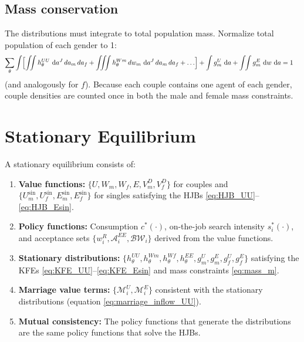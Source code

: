 \documentclass[11pt]{article}
\newcommand{\wR}{w^{R}}
\newcommand{\dw}{\,\mathrm{d}w}
\newcommand{\da}{\,\mathrm{d}a}
\begin{document}
\subsection{Mass conservation}

The distributions must integrate to total population mass. Normalize total population of each gender to 1:
\begin{align}
    \sum_\theta \int \Bigl[
        \int\!\!\!\int h_\theta^{UU}\, \da^J\, da_m\, da_f
        + \int\!\!\!\int\!\!\!\int h_\theta^{Wm}\, dw_m\, \da^J\, da_m\, da_f + \ldots
    \Bigr]
    + \int g_m^U\, \da + \int\!\!\int g_m^E\, \dw\, \da &= 1 \label{eq:mass_m}
\end{align}
(and analogously for $f$). Because each couple contains one agent of each gender, couple densities are counted once in both the male and female mass constraints.


\section{Stationary Equilibrium}

\begin{definition}
A stationary equilibrium consists of:
\begin{enumerate}
    \item \textbf{Value functions:} $\{U, W_m, W_f, E, V_m^D, V_f^D\}$ for couples and $\{U_m^{\sin}, U_f^{\sin}, E_m^{\sin}, E_f^{\sin}\}$ for singles satisfying the HJBs \eqref{eq:HJB_UU}--\eqref{eq:HJB_Esin}.
    \item \textbf{Policy functions:} Consumption $c^*(\cdot)$, on-the-job search intensity $s_i^*(\cdot)$, and acceptance sets $\{\wR_i, \mathcal{A}_i^{EE}, \mathcal{BW}_i\}$ derived from the value functions.
    \item \textbf{Stationary distributions:} $\{h_\theta^{UU}, h_\theta^{Wm}, h_\theta^{Wf}, h_\theta^{EE}, g_m^U, g_m^E, g_f^U, g_f^E\}$ satisfying the KFEs \eqref{eq:KFE_UU}--\eqref{eq:KFE_Esin} and mass constraints \eqref{eq:mass_m}.
    \item \textbf{Marriage value terms:} $\{\mathcal{M}_i^U, \mathcal{M}_i^E\}$ consistent with the stationary distributions (equation \eqref{eq:marriage_inflow_UU}).
    \item \textbf{Mutual consistency:} The policy functions that generate the distributions are the same policy functions that solve the HJBs.
\end{enumerate}
\end{definition}
\end{document}
